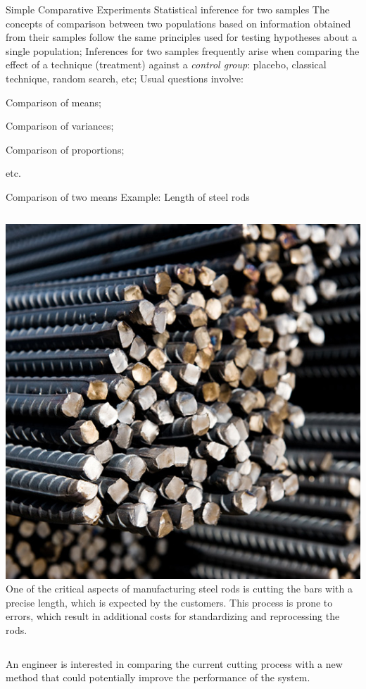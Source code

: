 \documentclass[t]{beamer}
\begin{document}

\begin{ftst}
{Simple Comparative Experiments}
{Statistical inference for two samples}
The concepts of comparison between two populations based on information obtained from their samples follow the same principles used for testing hypotheses about a single population;
\vone
Inferences for two samples frequently arise when comparing the effect of a technique (treatment) against a \textit{control group}: placebo, classical technique, random search, etc;
\vone
Usual questions involve:

\bitems Comparison of means;
\item Comparison of variances;
\item Comparison of proportions;
\item etc.
\eitem
\end{ftst}


\begin{ftst}
{Comparison of two means}
{Example: Length of steel rods}
\begin{columns}
\includegraphics[width=\textwidth]{../figs/steelrods.jpg}
One of the critical aspects of manufacturing steel rods is cutting the bars with a precise length, which is expected by the customers.
\vhalf
This process is prone to errors, which result in additional costs for standardizing and reprocessing the rods.
\end{columns}
\vone
An engineer is interested in comparing the current cutting process with a new method that could potentially improve the performance of the system.
\end{ftst}
\end{document}
